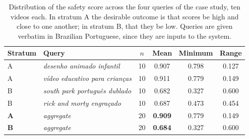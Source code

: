 \begin{table}[!t]
\centering
\caption{Distribution of the safety score across the four queries of the case study, ten videos each. In stratum A the desirable outcome is that scores be high and close to one another; in stratum B, that they be low. Queries are given verbatim in Brazilian Portuguese, since they are inputs to the system.}
\label{tab:estratos}
\begin{tabular}{llcccc}
\hline
Stratum & Query & $n$ & Mean & Minimum & Range \\
\hline
A & \emph{desenho animado infantil} & 10 & 0.907 & 0.798 & 0.127 \\
A & \emph{vídeo educativo para crianças} & 10 & 0.911 & 0.779 & 0.149 \\
B & \emph{south park português dublado} & 10 & 0.682 & 0.327 & 0.600 \\
B & \emph{rick and morty engraçado} & 10 & 0.687 & 0.473 & 0.454 \\
\hline
\textbf{A} & \emph{aggregate} & 20 & \textbf{0.909} & 0.779 & 0.149 \\
\textbf{B} & \emph{aggregate} & 20 & \textbf{0.684} & 0.327 & 0.600 \\
\hline
\end{tabular}
\end{table}
